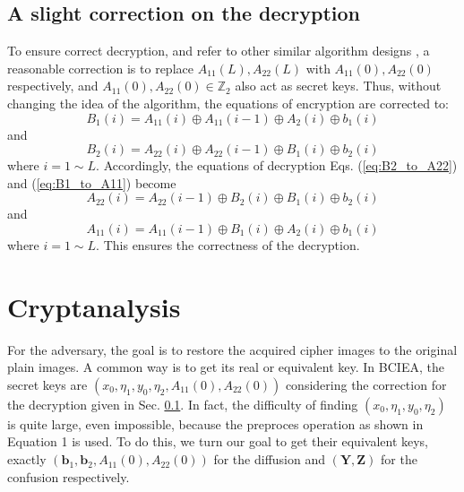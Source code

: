 \documentclass[final,3p,times]{elsarticle}
\begin{document}
\subsection{A slight correction on the decryption}
\label{ssec:correction}

To ensure correct decryption, and refer to other similar algorithm designs \cite{ozkaynak:review:ND18}, a reasonable correction is to replace $A_{11}(L),A_{22}(L)$ with $A_{11}(0),A_{22}(0)$ respectively, and $A_{11}(0),A_{22}(0) \in \mathbb{Z}_{2}$ also act as secret keys.
Thus, without changing the idea of the algorithm, the equations of encryption are corrected to:
\begin{equation}
B_1(i) = A_{11}(i) \oplus A_{11}(i-1) \oplus A_{2}(i) \oplus b_{1}(i)
\label{eq:corr_B1_diffusion}
\end{equation}
and 
\begin{equation}
B_2(i) = A_{22}(i) \oplus A_{22}(i-1) \oplus B_{1}(i) \oplus b_{2}(i)
\label{eq:corr_B2_diffusion}
\end{equation}
where $i=1 \sim L$. Accordingly, the equations of decryption Eqs. (\ref{eq:B2_to_A22}) and (\ref{eq:B1_to_A11}) become
\begin{equation}
A_{22}(i) = A_{22}(i-1) \oplus B_2(i) \oplus B_{1}(i) \oplus b_{2}(i)
\label{eq:corr_B2_to_A22}
\end{equation}
and
\begin{equation}
A_{11}(i) = A_{11}(i-1)\oplus B_1(i) \oplus A_{2}(i) \oplus b_{1}(i)
\label{eq:corr_B1_to_A11}
\end{equation}
where $i=1 \sim L$. 
This ensures the correctness of the decryption.

\section{Cryptanalysis}
\label{sec3:Cryptanalysis}

For the adversary, the goal is to restore the acquired cipher images to the original plain images. A common way is to get its real or equivalent key. In BCIEA, the secret keys are $(x_0,\eta_1,y_0,\eta_2,A_{11}(0),A_{22}(0))$ considering the correction for the decryption given in Sec. \ref{ssec:correction}. 
In fact, the difficulty of finding $(x_0,\eta_1,y_0,\eta_2)$ is quite large, even impossible, because the preproces operation as shown in Equation 1 is used. To do this, we turn our goal to get their equivalent keys, exactly $(\bm{b}_1,\bm{b}_2,A_{11}(0),A_{22}(0))$ for the diffusion and $(\bm{Y},\bm{Z})$ for the confusion respectively.
\end{document}
